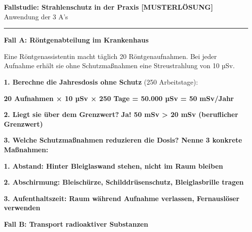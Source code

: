 \documentclass[10pt, a4paper]{article}
\newcommand{\fachfarbe}{physik}
\newcommand{\lsg}[1]{\textcolor{loesung}{\textbf{#1}}}
\newcommand{\abschnitt}[1]{%
    \vspace{8pt}\noindent\textbf{\textcolor{\fachfarbe}{#1}}\vspace{4pt}
}
\begin{document}

\newpage

\begin{center}
{\large\bfseries Fallstudie: Strahlenschutz in der Praxis \textcolor{loesung}{[MUSTERLÖSUNG]}}\\[2pt]
{\small\textcolor{grau}{Anwendung der 3 A's}}
\end{center}
\vspace{-2pt}\hrule\vspace{12pt}

\abschnitt{Fall A: Röntgenabteilung im Krankenhaus}

\begin{merksatz}[Szenario]
Eine Röntgenassistentin macht täglich 20 Röntgenaufnahmen. Bei jeder Aufnahme erhält sie ohne Schutzmaßnahmen eine Streustrahlung von 10 µSv.
\end{merksatz}

\vspace{6pt}

\textbf{1. Berechne die Jahresdosis ohne Schutz} (250 Arbeitstage):

\vspace{4pt}
\lsg{20 Aufnahmen × 10 µSv × 250 Tage = 50.000 µSv = 50 mSv/Jahr}

\vspace{8pt}

\textbf{2. Liegt sie über dem Grenzwert?} \lsg{Ja! 50 mSv > 20 mSv (beruflicher Grenzwert)}

\vspace{8pt}

\textbf{3. Welche Schutzmaßnahmen reduzieren die Dosis? Nenne 3 konkrete Maßnahmen:}

\vspace{4pt}
\lsg{1. Abstand: Hinter Bleiglaswand stehen, nicht im Raum bleiben}

\vspace{4pt}
\lsg{2. Abschirmung: Bleischürze, Schilddrüsenschutz, Bleiglasbrille tragen}

\vspace{4pt}
\lsg{3. Aufenthaltszeit: Raum während Aufnahme verlassen, Fernauslöser verwenden}

\vspace{12pt}

\abschnitt{Fall B: Transport radioaktiver Substanzen}
\end{document}
